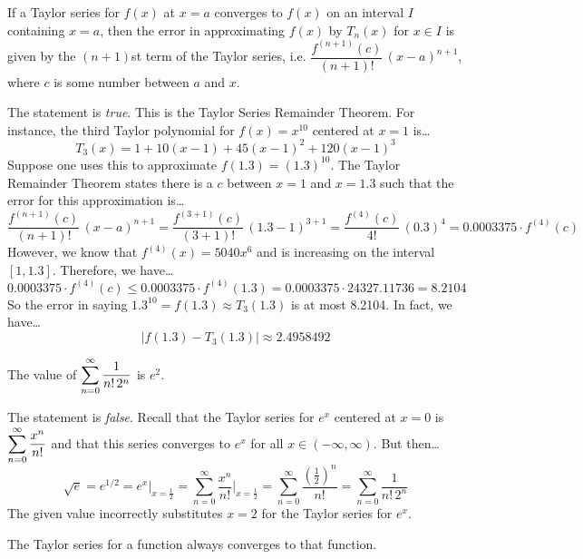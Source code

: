 \documentclass[11pt,letterpaper]{article}
\begin{document}
 If a Taylor series for $f(x)$ at $x= a$ converges to $f(x)$ on an interval $I$ containing $x= a$, then the error in approximating $f(x)$ by $T_n(x)$ for $x \in I$ is given by the $(n+1)$st term of the Taylor series, i.e. $\dfrac{f^{(n+1)}(c)}{(n+1)!} \,(x - a)^{n + 1}$, where $c$ is some number between $a$ and $x$. \pspace

\sol The statement is \textit{true}. This is the Taylor Series Remainder Theorem. For instance, the third Taylor polynomial for $f(x)= x^{10}$ centered at $x= 1$ is\dots
	\[
	T_3(x)= 1 + 10(x - 1) + 45(x - 1)^2 + 120(x - 1)^3
	\]
Suppose one uses this to approximate $f(1.3)= (1.3)^{10}$. The Taylor Remainder Theorem states there is a $c$ between $x= 1$ and $x= 1.3$ such that the error for this approximation is\dots
	\[
	\dfrac{f^{(n+1)}(c)}{(n+1)!} \,(x - a)^{n + 1}= \dfrac{f^{(3+1)}(c)}{(3+1)!} \,(1.3 - 1)^{3 + 1}= \dfrac{f^{(4)}(c)}{4!} \,(0.3)^4= 0.0003375 \cdot f^{(4)}(c) 
	\]
However, we know that $f^{(4)}(x)= 5040x^6$ and is increasing on the interval $[1, 1.3]$. Therefore, we have\dots
	\[
	0.0003375 \cdot f^{(4)}(c) \leq 0.0003375 \cdot f^{(4)}(1.3)= 0.0003375 \cdot 24327.11736= 8.2104
	\]
So the error in saying $1.3^{10}= f(1.3) \approx T_3(1.3)$ is at most 8.2104. In fact, we have\dots
	\[
	|f(1.3) - T_3(1.3)| \approx 2.4958492
	\] \pvspace{1.3cm}



 The value of $\displaystyle\sum_{n=0}^\infty \dfrac{1}{n! \, 2^n}$ is $e^2$. \pspace

\sol The statement is \textit{false}. Recall that the Taylor series for $e^x$ centered at $x= 0$ is $\displaystyle\sum_{n=0}^\infty \dfrac{x^n}{n!}$ and that this series converges to $e^x$ for all $x \in (-\infty, \infty)$. But then\dots
	\[
	\sqrt{e}= e^{1/2}= e^x \bigg|_{x= \frac{1}{2}}= \sum_{n=0}^\infty \dfrac{x^n}{n!} \bigg|_{x= \frac{1}{2}}= \sum_{n=0}^\infty \dfrac{\left(\tfrac{1}{2} \right)^n}{n!}=  \sum_{n=0}^\infty \dfrac{1}{n! \, 2^n}
	\]
The given value incorrectly substitutes $x= 2$ for the Taylor series for $e^x$. \pvspace{1.3cm}



 The Taylor series for a function always converges to that function. \pspace
\end{document}

